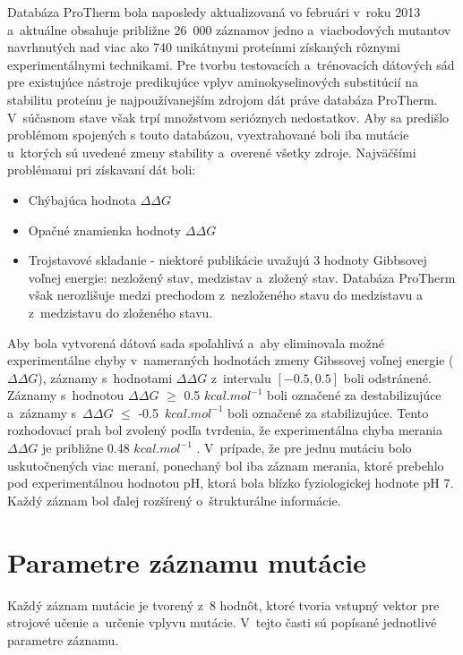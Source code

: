 Databáza ProTherm bola naposledy aktualizovaná vo februári v~roku 2013 a~aktuálne obsahuje približne 26 000 záznamov jedno a~viacbodových mutantov navrhnutých nad viac ako 740 unikátnymi proteínmi získaných rôznymi experimentálnymi technikami. Pre tvorbu testovacích a~trénovacích dátových sád pre existujúce nástroje predikujúce vplyv aminokyselinových substitúcií na stabilitu proteínu je najpoužívanejším zdrojom dát práve databáza ProTherm. V~súčasnom stave však trpí množstvom serióznych nedostatkov. Aby sa predišlo problémom spojených s touto databázou, vyextrahované boli iba mutácie u~ktorých sú uvedené zmeny stability a~overené všetky zdroje. Najväčšími problémami pri získavaní dát boli:
\begin{itemize}
	\item Chýbajúca hodnota $\Delta\Delta G$
	\item Opačné znamienka hodnoty $\Delta\Delta G$ 
	\item Trojstavové skladanie - niektoré publikácie uvažujú 3 hodnoty Gibbsovej voľnej energie: nezložený stav, medzistav a~zložený stav. Databáza ProTherm však nerozlišuje medzi prechodom z~nezloženého stavu do medzistavu a z~medzistavu do zloženého stavu.
\end{itemize}

Aby bola vytvorená dátová sada spoľahlivá a~aby eliminovala možné experimentálne chyby v~nameraných hodnotách zmeny Gibssovej voľnej energie ($\Delta\Delta G$), záznamy s~hodnotami $\Delta\Delta G$ z~intervalu $\left[-0.5,0.5\right]$ boli odstránené. Záznamy s~hodnotou $\Delta\Delta G$ $\geq$ 0.5 $kcal.mol^{-1}$ boli označené za destabilizujúce a~záznamy s~$\Delta\Delta G$ $\leq$ -0.5~$kcal.mol^{-1}$ boli označené za stabilizujúce. Tento rozhodovací prah bol zvolený podľa tvrdenia, že experimentálna chyba merania $\Delta\Delta G$ je približne 0.48 $kcal.mol^{-1}$ \cite{threshold}.
V~prípade, že pre jednu mutáciu bolo uskutočnených viac meraní, ponechaný bol iba záznam merania, ktoré prebehlo pod experimentálnou hodnotou pH, ktorá bola blízko fyziologickej hodnote pH 7. Každý záznam bol ďalej rozšírený o~štrukturálne informácie.

\section{Parametre záznamu mutácie}

Každý záznam mutácie je tvorený z~8 hodnôt, ktoré tvoria vstupný vektor pre strojové učenie a~určenie vplyvu mutácie. V~tejto časti sú popísané jednotlivé parametre záznamu.

